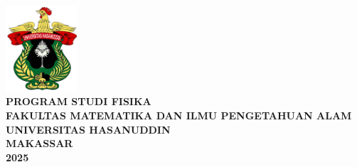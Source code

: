 \begingroup
\singlespacing
\fontsize{11pt}{13pt}\selectfont
\begin{center}
  \textbf{\JudulSkripsi} \\
  \vfill
  \textbf{\NamaPenulis} \\
  \textbf{\NIM} \\
  \vspace*{1.5cm}
  \includegraphics[height=3.2cm]{gambar/uh-fc.png} \\
  \vfill
  \textbf{PROGRAM STUDI FISIKA} \\
  \textbf{FAKULTAS MATEMATIKA DAN ILMU PENGETAHUAN ALAM} \\
  \textbf{UNIVERSITAS HASANUDDIN} \\
  \textbf{MAKASSAR} \\
  \textbf{2025}
\end{center}
\endgroup
\restoregeometry
